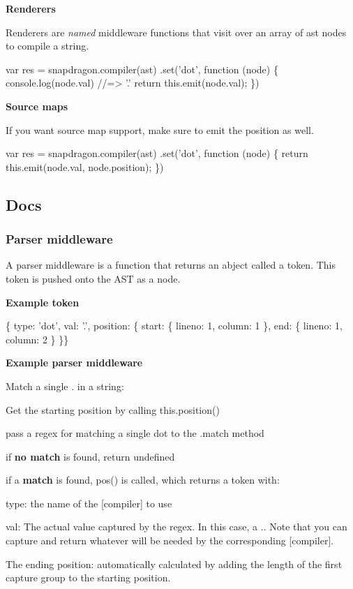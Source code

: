 {\bfseries Renderers}

Renderers are {\itshape named} middleware functions that visit over an array of ast nodes to compile a string.


\begin{DoxyCode}
var res = snapdragon.compiler(ast)
  .set('dot', function (node) \{
    console.log(node.val)
    //=> '.'
    return this.emit(node.val);
  \})
\end{DoxyCode}


{\bfseries Source maps}

If you want source map support, make sure to emit the position as well.


\begin{DoxyCode}
var res = snapdragon.compiler(ast)
  .set('dot', function (node) \{
    return this.emit(node.val, node.position);
  \})
\end{DoxyCode}


\subsection*{Docs}

\subsubsection*{Parser middleware}

A parser middleware is a function that returns an abject called a {\ttfamily token}. This token is pushed onto the A\+ST as a node.

{\bfseries Example token}


\begin{DoxyCode}
\{ type: 'dot',
  val: '.',
  position:
   \{ start: \{ lineno: 1, column: 1 \},
     end: \{ lineno: 1, column: 2 \} \}\}
\end{DoxyCode}


{\bfseries Example parser middleware}

Match a single {\ttfamily .} in a string\+:


\begin{DoxyEnumerate}
\item Get the starting position by calling {\ttfamily this.\+position()}
\item pass a regex for matching a single dot to the {\ttfamily .match} method
\item if {\bfseries no match} is found, return {\ttfamily undefined}
\item if a {\bfseries match} is found, {\ttfamily pos()} is called, which returns a token with\+:
\begin{DoxyItemize}
\item {\ttfamily type}\+: the name of the \mbox{[}compiler\mbox{]} to use
\item {\ttfamily val}\+: The actual value captured by the regex. In this case, a {\ttfamily .}. Note that you can capture and return whatever will be needed by the corresponding \mbox{[}compiler\mbox{]}.
\item The ending position\+: automatically calculated by adding the length of the first capture group to the starting position.
\end{DoxyItemize}
\end{DoxyEnumerate}

